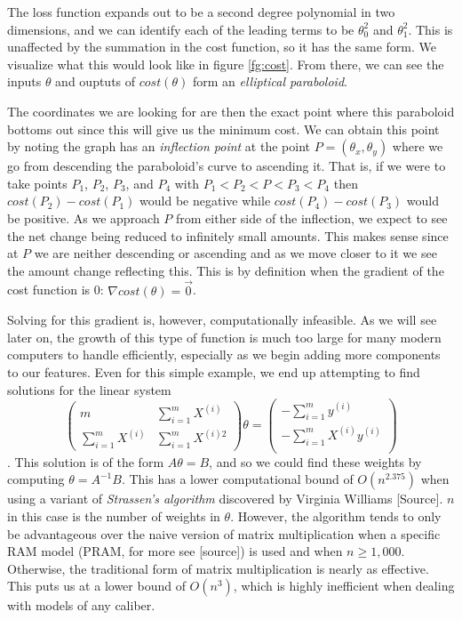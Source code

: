 The loss function expands out to be a second degree polynomial in two
dimensions, and we can identify each of the leading terms to be $\theta_0^2$ and
$\theta_1^2$. This is unaffected by the summation in the cost function, so it
has the same form. We visualize what this would look like in figure
\ref{fg:cost}. From there, we can see the inputs $\theta$ and ouptuts of
$cost(\theta)$ form an \emph{elliptical paraboloid}.

The coordinates we are looking for are then the exact point where this
paraboloid bottoms out since this will give us the minimum cost. We can obtain
this point by noting the graph has an \emph{inflection point} at the point $P =
(\theta_x, \theta_y)$ where we go from descending the paraboloid's curve to
ascending it. That is, if we were to take points $P_1$, $P_2$, $P_3$, and $P_4$
with $P_1 < P_2 < P < P_3 < P_4$ then $cost(P_2) - cost(P_1)$ would be negative
while $cost(P_4) - cost(P_3)$ would be positive. As we approach $P$ from either
side of the inflection, we expect to see the net change being 
reduced to infinitely small amounts. This makes sense since at
$P$ we are neither descending or ascending and as we move closer to it we see
the amount change reflecting this. This is by definition when the gradient of
the cost function is 0: $\nabla cost(\theta) = \vec{0}$.

Solving for this gradient is, however, computationally infeasible. As we will
see later on, the growth of this type of function is much too large for many
modern computers to handle efficiently, especially as we begin adding more
components to our features. Even for this simple example, we end up attempting
to find solutions for the linear system
\begin{equation*}
    \begin{pmatrix}
        m & \sum_{i=1}^{m}X^{(i)} \\[6pt] 
        \sum_{i=1}^{m}X^{(i)} & \sum_{i=1}^{m}X^{(i)2}
    \end{pmatrix}
    \theta
    =
    \begin{pmatrix}
        -\sum_{i=1}^{m}y^{(i)} \\[6pt]
        -\sum_{i=1}^{m}X^{(i)}y^{(i)} \\
    \end{pmatrix}
\end{equation*}
. This solution is of the form $A\theta = B$, and so we could find these weights
by computing $\theta =A^{-1}B$. This has a lower computational bound of
$O(n^{2.375})$ when using a variant of \emph{Strassen's algorithm} discovered by
Virginia Williams [Source]. $n$ in this case is the number of weights in
$\theta$. However, the algorithm tends to only be advantageous over the naive
version of matrix multiplication when a specific RAM model (PRAM, for more see
[source]) is used and when $n \geq 1,000$. Otherwise, the traditional form of
matrix multiplication is nearly as effective. This puts us at a lower bound of
$O(n^3)$, which is highly inefficient when dealing with models of any caliber.

